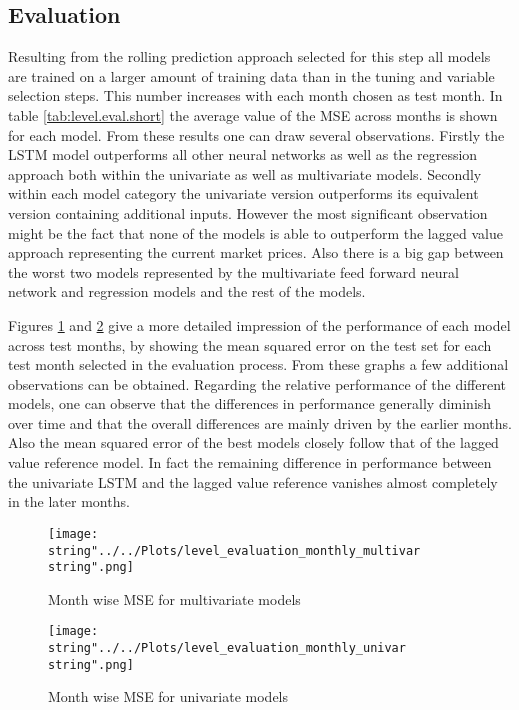 \subsection{Evaluation}
Resulting from the rolling prediction approach selected for this step all models are trained on a larger amount of training data than in the tuning and variable selection steps. This number increases with each month chosen as test month. In table \ref{tab:level.eval.short} the average value of the MSE across months is shown for each model. From these results one can draw several observations. Firstly the LSTM model outperforms all other neural networks as well as the regression approach both within the univariate as well as multivariate models. Secondly within each model category the univariate version outperforms its equivalent version containing additional inputs. However the most significant observation  might be the fact that none of the models is able to outperform the lagged value approach representing the current market prices. Also there is a big gap between the worst two models represented by the multivariate feed forward neural network and regression models and the rest of the models.

Figures \ref{fig:level_evaluation_monthly_multivar} and \ref{fig:level_evaluation_monthly_univar} give  a more detailed impression of the performance of each model across test months, by showing the mean squared error on the test set for each test month selected in the evaluation process. From these graphs a few additional observations can be obtained. Regarding the relative performance of the different models, one can observe that the differences in performance generally diminish over time and that the  overall differences are mainly driven by the earlier months. Also the mean squared error of the best models closely follow that of the lagged value reference model. In fact the remaining difference in performance between the univariate LSTM and the lagged value reference vanishes almost completely in the later months.

\begin{figure}[h!]
  \centering
\texttt{[image: \\string"../../Plots/level\_evaluation\_monthly\_multivar\\string".png]}
  \caption{Month wise MSE for multivariate models}\label{fig:level_evaluation_monthly_multivar}
\end{figure}

\begin{figure}[h!]
  \centering
\texttt{[image: \\string"../../Plots/level\_evaluation\_monthly\_univar\\string".png]}
  \caption{Month wise MSE for univariate models}\label{fig:level_evaluation_monthly_univar}
\end{figure}

